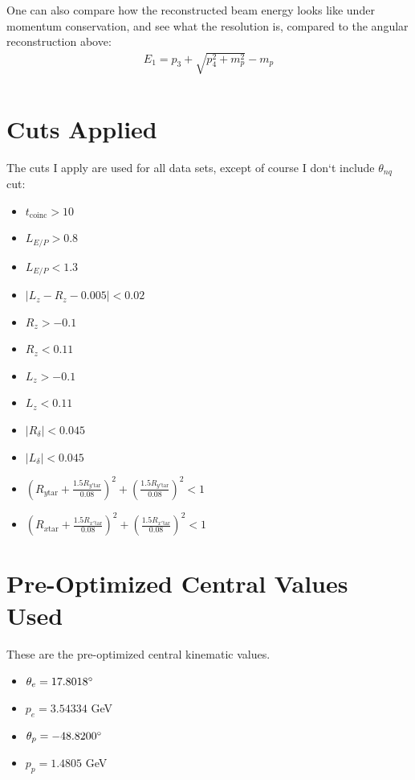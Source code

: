 \documentclass{article}
\begin{document}
One can also compare how the reconstructed beam energy looks like under momentum conservation, and see what the resolution is, compared to the angular reconstruction above:
\begin{equation*}
	\begin{gathered}
		E_1 = p_{3} + \sqrt{p_{4}^2 + m_p^2   } -m_p	\\
	\end{gathered}
\end{equation*}

\clearpage

\section*{Cuts Applied}
The cuts I apply are used for all data sets, except of course I don`t include $\theta_{nq}$ cut:
\begin{itemize}
\item{$t_\textrm{coinc} > 10$}
\item{$L_{E/P} >  0.8 $}
\item{$L_{E/P} <  1.3 $}
\item{$|L_z - R_z - 0.005| < 0.02$}
\item{$R_z > -0.1 $}
\item{$R_z < 0.11 $}
\item{$L_z > -0.1 $}
\item{$L_z < 0.11 $}
\item{$|R_\delta| < 0.045 $}
\item{$|L_\delta| < 0.045 $}
\item{$ \left( R_{y\textrm{tar}} + \frac{1.5 R_{y'\textrm{tar}}}{0.08} \right)^2 + \left( \frac{1.5 R_{y'\textrm{tar}}}{0.08} \right)^2 < 1 $}
\item{$ \left( R_{x\textrm{tar}} + \frac{1.5 R_{x'\textrm{tar}}}{0.08} \right)^2 + \left( \frac{1.5 R_{x'\textrm{tar}}}{0.08} \right)^2 < 1 $}
\end{itemize}

\section*{Pre-Optimized Central Values Used}
These are the pre-optimized central kinematic values.
\begin{itemize}
\item{$\theta_e = 17.8018\degree$}
\item{$p_e = 3.54334$ GeV}
\item{$\theta_p = -48.8200\degree$}
\item{$p_p = 1.4805$ GeV}
\end{itemize}
\end{document}
